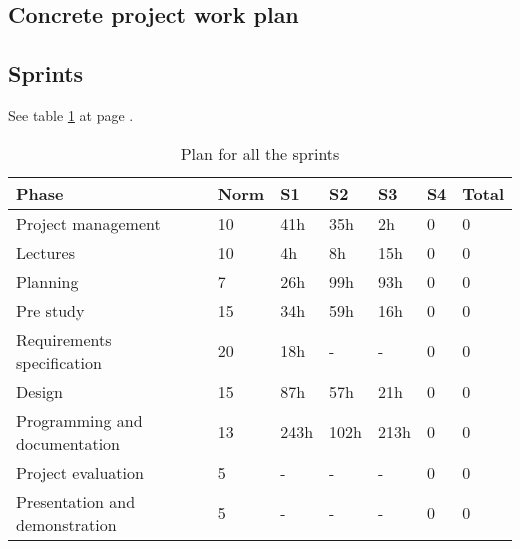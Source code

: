 

\subsection{Concrete project work plan}

\subsection*{Sprints}
See table \ref{tab:allsprints} at page \pageref{tab:allsprints}.
\begin{table}
\begin{tabular}{l|l|l|l|l|l|l} \hline
\textbf{Phase} &  \textbf{Norm} & \textbf{S1} & \textbf{S2}  & \textbf{S3} & \textbf{S4} & \textbf{Total} \\ \hline \hline
Project management & 10 & 41h & 35h & 2h & 0 & 0\\
Lectures & 10 & 4h & 8h & 15h & 0 & 0\\
Planning & 7 & 26h & 99h & 93h & 0 & 0\\
Pre study & 15 & 34h & 59h & 16h & 0 & 0\\
Requirements specification & 20 & 18h & - & - & 0 & 0\\
Design & 15 & 87h & 57h & 21h & 0 & 0\\
Programming and documentation & 13 & 243h & 102h & 213h & 0 & 0\\
Project evaluation & 5 & - & - & - & 0 & 0\\
Presentation and demonstration & 5 & - & - & - & 0 & 0\\ \hline
\end{tabular}
\caption{Plan for all the sprints} \label{tab:allsprints}
\end{table}


